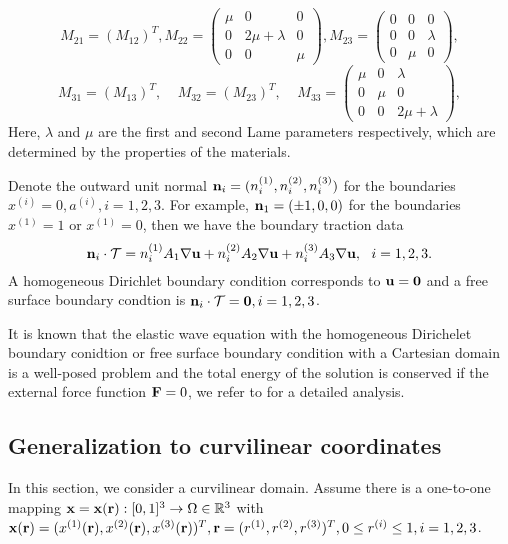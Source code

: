 \documentclass[a4paper]{article}
\begin{document}
\[ M_{21} =(M_{12})^T, M_{22} = \left(\begin{array}{ccc}
\mu & 0 & 0\\
0 & 2\mu+\lambda & 0\\
0 & 0 & \mu\end{array}\right), M_{23} = \left(\begin{array}{ccc}
0 & 0 & 0\\
0 & 0 & \lambda\\
0 & \mu & 0\end{array}\right),\]
\[ M_{31} = (M_{13})^T, \ \ \ \ \ M_{32} =(M_{23})^T, \ \ \ \ \ M_{33} = \left(\begin{array}{ccc}
\mu & 0 & \lambda\\
0 & \mu & 0\\
0 & 0 & 2\mu+\lambda\end{array}\right),\]
Here, $\lambda$ and $\mu$ are the first and second Lame parameters respectively, which are determined by the properties of the materials.

Denote the outward unit normal ${\bf n}_i = (n_i^{(1)},n_i^{(2)},n_i^{(3)})$ for the boundaries $x^{(i)} = 0, a^{(i)}, i = 1,2,3$. For example, ${\bf n}_1 = (\pm 1, 0,0)$ for the boundaries $x^{(1)} = 1$ or $x^{(1)} = 0$, then we have the boundary traction data 
\begin{equation*}
{\bf n}_i\cdot\mathcal{T} = n^{(1)}_iA_1\nabla{\bf u} + n^{(2)}_iA_2\nabla{\bf u} + n^{(3)}_iA_3\nabla{\bf u},\ \ i = 1,2,3. 
\end{equation*}
A homogeneous Dirichlet boundary condition corresponds to ${\bf u} = {\bf 0}$ and a free surface boundary condtion is ${\bf n}_i\cdot\mathcal{T}  = {\bf 0}, i = 1,2,3$.

It is known that the elastic wave equation with the homogeneous Dirichelet boundary conidtion or free surface boundary condition with a Cartesian domain is a well-posed problem and the total energy of the solution is conserved if the external force function ${\bf F} = 0$, we refer to \cite{?} for a detailed analysis.

\subsection{Generalization to curvilinear coordinates}

In this section, we consider a curvilinear domain. Assume there is a one-to-one mapping ${\bf x} = {\bf x}({\bf r}) : [0,1]^3 \rightarrow \Omega \in \mathbb{R}^3$ with ${\bf x}({\bf r}) = (x^{(1)}({\bf r}),x^{(2)}({\bf r}),x^{(3)}({\bf r}))^T, {\bf r} = (r^{(1)},r^{(2)},r^{(3)})^T, 0\leq r^{(i)}\leq1, i = 1,2,3$.
\end{document}
